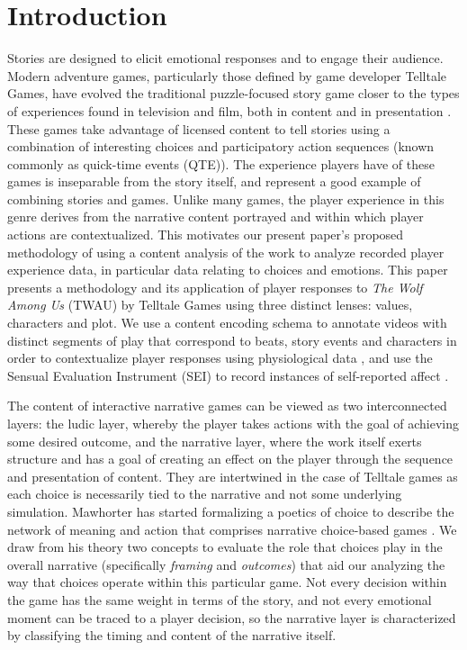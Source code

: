 \section{Introduction}
\label{sec:orgdbcc5cd}
Stories are designed to elicit emotional responses and to engage their
audience. Modern adventure games, particularly those defined by game
developer Telltale Games, have evolved the traditional puzzle-focused
story game closer to the types of experiences found in television and
film, both in content and in presentation \cite{Parker2013-el}. These
games take advantage of licensed content to tell stories using a
combination of interesting choices and participatory action sequences
(known commonly as quick-time events (QTE)). The experience players
have of these games is inseparable from the story itself, and
represent a good example of combining stories and games. Unlike many
games, the player experience in this genre derives from the narrative
content portrayed and within which player actions are
contextualized. This motivates our present paper's proposed
methodology of using a content analysis of the work to analyze
recorded player experience data, in particular data relating to
choices and emotions. This paper presents a methodology and its
application of player responses to \emph{The Wolf Among Us} (TWAU) by
Telltale Games \cite{Telltale_Games2013-hz} using three distinct
lenses: values, characters and plot. We use a content encoding schema
to annotate videos with distinct segments of play that correspond to
beats, story events and characters in order to contextualize player
responses using physiological data \cite{Robinson2016-qr}, and use the
Sensual Evaluation Instrument (SEI) to record instances of
self-reported affect \cite{Isbister2006-sc}.

The content of interactive narrative games can be viewed as two
interconnected layers: the ludic layer, whereby the player takes
actions with the goal of achieving some desired outcome, and the
narrative layer, where the work itself exerts structure and has a goal
of creating an effect on the player through the sequence and
presentation of content. They are intertwined in the case of Telltale
games as each choice is necessarily tied to the narrative and not some
underlying simulation. Mawhorter has started formalizing a poetics of
choice to describe the network of meaning and action that comprises
narrative choice-based games \cite{Mawhorter2016-cx}. We draw from his
theory two concepts to evaluate the role that choices play in the
overall narrative (specifically \emph{framing} and \emph{outcomes}) that aid our
analyzing the way that choices operate within this particular
game. Not every decision within the game has the same weight in terms
of the story, and not every emotional moment can be traced to a player
decision, so the narrative layer is characterized by classifying the
timing and content of the narrative itself.

